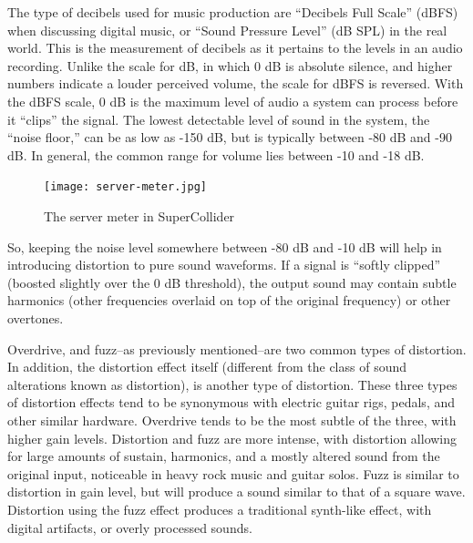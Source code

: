 The type of decibels used for music production are ``Decibels Full Scale'' (dBFS) when discussing digital music, or ``Sound Pressure Level'' (dB SPL) in the real world. This is the measurement of decibels as it pertains to the levels in an audio recording. Unlike the scale for dB, in which 0 dB is absolute silence, and higher numbers indicate a louder perceived volume, the scale for dBFS is reversed. With the dBFS scale, 0 dB is the maximum level of audio a system can process before it ``clips'' the signal. The lowest detectable level of sound in the system, the ``noise floor,''  can be as low as -150 dB, but is typically between -80 dB and -90 dB. In general, the common range for volume lies between -10 and -18 dB.

\begin{figure}[ht]
  \centering
  \texttt{[image: server-meter.jpg]}
  \caption{The server meter in SuperCollider}
  \label{fig:server-meter}
\end{figure}

So, keeping the noise level somewhere between -80 dB and -10 dB will help in introducing distortion to pure sound waveforms. If a signal is ``softly clipped'' (boosted slightly over the 0 dB threshold), the output sound may contain subtle harmonics (other frequencies overlaid on top of the original frequency) or other overtones. 

Overdrive, and fuzz--as previously mentioned--are two common types of distortion. In addition, the distortion effect itself (different from the class of sound alterations known as distortion), is another type of distortion. These three types of distortion effects tend to be synonymous with electric guitar rigs, pedals, and other similar hardware. Overdrive tends to be the most subtle of the three, with higher gain levels. Distortion and fuzz are more intense, with distortion allowing for large amounts of sustain, harmonics, and a mostly altered sound from the original input, noticeable in heavy rock music and guitar solos. Fuzz is similar to distortion in gain level, but will produce a sound similar to that of a square wave. Distortion using the fuzz effect produces a traditional synth-like effect, with digital artifacts, or overly processed sounds.

